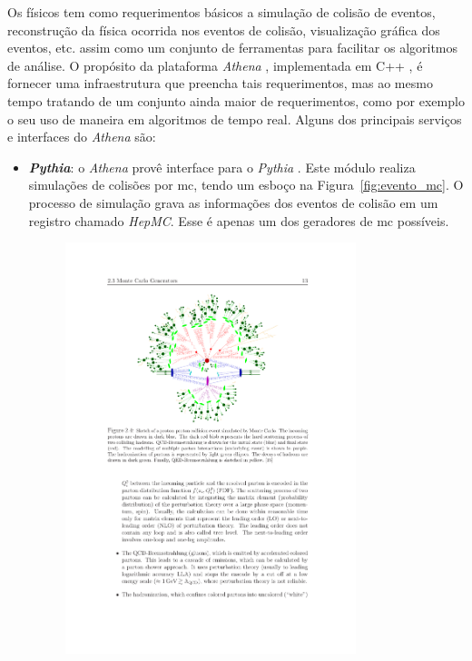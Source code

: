 
Os físicos tem como requerimentos básicos a simulação de colisão de
eventos, reconstrução da física ocorrida nos eventos de colisão, visualização
gráfica dos eventos, etc. assim como um conjunto de ferramentas para facilitar
os algoritmos de análise. O propósito da plataforma \emph{Athena}
\cite{atlascwb,atlaswb}, implementada em C++ \cite{CPP_COMPLETE}, 
é fornecer uma infraestrutura que preencha tais requerimentos, 
mas ao mesmo tempo tratando de um conjunto ainda maior de 
requerimentos, como por exemplo o seu uso de maneira em algoritmos de tempo real. 
Alguns dos principais serviços e interfaces do \emph{Athena} são:

\begin{itemize}
\item \textbf{\emph{Pythia}}: o \emph{Athena} provê interface para o
\emph{Pythia} \cite{pythia}. Este módulo
realiza simulações de colisões por \gls{mc}, tendo um esboço na
Figura~\ref{fig:evento_mc}. O processo de simulação grava as
informações dos eventos de colisão em um registro chamado \emph{HepMC}. Esse é
apenas um dos geradores de \gls{mc} possíveis.
\begin{figure}[b!]
\centering
\includegraphics[width=0.8\textwidth]{imagens/evento_mc.pdf}

\end{figure}
\end{itemize}
